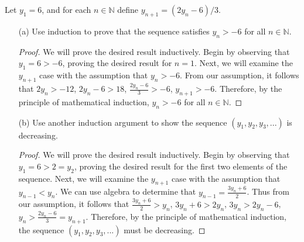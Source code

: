 \documentclass[11pt]{article}
\def\N{{\mathbb{N}}}
\newenvironment{exer}[1]
    {\renewcommand\theinnercustomexer{#1}\innercustomexer\upshape}
    {\endinnercustomexer}
\begin{document}
\begin{exer}{1.2.12}
    Let $y_1=6$, and for each $n\in\N$ define $y_{n+1}=(2y_n-6)/3$.
    \begin{enumerate}
        \item[(a)]
            Use induction to prove that the sequence satisfies $y_n>-6$ for all $n\in\N$.
            \begin{proof}
                We will prove the desired result inductively. Begin by observing that $y_1=6>-6$, proving the desired result for $n=1$. Next, we will examine the $y_{n+1}$ case with the assumption that $y_n>-6$. From our assumption, it follows that $2y_n>-12$, $2y_n-6>18$, $\frac{2y_n-6}{3}>-6$, $y_{n+1}>-6$. Therefore, by the principle of mathematical induction, $y_n>-6$ for all $n\in\N$.
            \end{proof}
        \item[(b)]
            Use another induction argument to show the sequence $(y_1,y_2,y_3,...)$ is decreasing.
            \begin{proof}
                We will prove the desired result inductively. Begin by observing that $y_1=6>2=y_2$, proving the desired result for the first two elements of the sequence. Next, we will examine the $y_{n+1}$ case with the assumption that $y_{n-1}<y_n$. We can use algebra to determine that $y_{n-1}=\frac{3y_n+6}{2}$. Thus from our assumption, it follows that $\frac{3y_n+6}{2}>y_n$, $3y_n+6>2y_n$, $3y_n>2y_n-6$, $y_n>\frac{2y_n-6}{3}=y_{n+1}$. Therefore, by the principle of mathematical induction, the sequence $(y_1,y_2,y_3,...)$ must be decreasing.
            \end{proof}
    \end{enumerate}
\end{exer}
\end{document}
